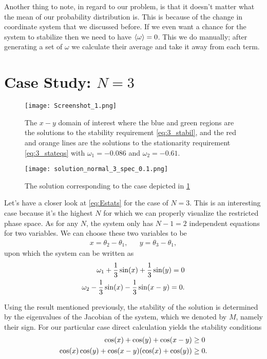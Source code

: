 \documentclass[10pt,a4paper,twocolumn]{article}
\begin{document}
Another thing to note, in regard to our problem, is that it doesn't matter what the mean of our probability distribution is. This is because of the change in coordinate system that we discussed before. If we even want a chance for the system to stabilize then we need to have $\braket{\omega} = 0$. This we do manually; after generating a set of $\omega$ we calculate their average and take it away from each term. 


\section{Case Study: \texorpdfstring{$N=3$}{N=3}}

\begin{figure}[!t]
    \centering
    \texttt{[image: Screenshot\_1.png]}
    \caption{The $x-y$ domain of interest where the blue and green regions are the solutions to the stability requirement \cref{eq:3_stabil}, and the red and orange lines are the solutions to the stationarity requirement \cref{eq:3_stateqs} with $\omega_1 = -0.086$ and $\omega_2 = -0.61$.}
    \label{fig:3_1}
\end{figure}

\begin{figure}[!b]
    \centering
    \texttt{[image: solution\_normal\_3\_spec\_0.1.png]}
    \caption{The solution corresponding to the case depicted in \cref{fig:3_1}}
    \label{fig:3_1_sol}
\end{figure}

Let's have a closer look at \cref{eq:Estats} for the case of $N=3$. This is an interesting case because it's the highest $N$ for which we can properly visualize the restricted phase space. As for any $N$, the system only has $N-1=2$ independent equations for two variables. We can choose these two variables to be
%
\begin{align}
    &x = \theta_2 - \theta_1,& &y = \theta_3 - \theta_1,&
\end{align}
%
upon which the system can be written as
%
\begin{align}\label{eq:3_stateqs}
    \omega_1 + \frac{1}{3} \sin(x) + \frac{1}{3} \sin(y) = 0\notag\\
    \omega_2 - \frac{1}{3} \sin(x) - \frac{1}{3} \sin(x - y) = 0.
\end{align} 

Using the result mentioned previously, the stability of the solution is determined by the eigenvalues of the Jacobian of the system, which we denoted by $M$, namely their sign. For our particular case direct calculation yields the stability conditions
%
\begin{align}\label{eq:3_stabil}
    \cos(x) + \cos(y) + \cos(x - y) &\geq 0\notag\\
    \cos(x) \cos(y) + \cos(x - y) (\cos(x) + \cos(y)) &\geq 0.
\end{align}
\end{document}
